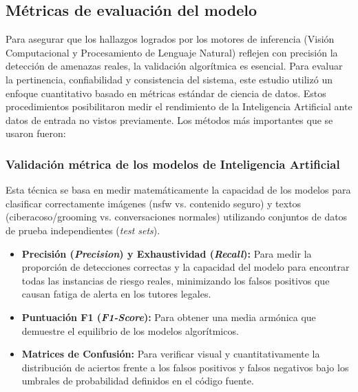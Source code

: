 \subsection{Métricas de evaluación del modelo}
Para asegurar que los hallazgos logrados por los motores de inferencia (Visión Computacional y Procesamiento de Lenguaje Natural) reflejen con precisión la detección de amenazas reales, la validación algorítmica es esencial. Para evaluar la pertinencia, confiabilidad y consistencia del sistema, este estudio utilizó un enfoque cuantitativo basado en métricas estándar de ciencia de datos. Estos procedimientos posibilitaron medir el rendimiento de la Inteligencia Artificial ante datos de entrada no vistos previamente. Los métodos más importantes que se usaron fueron:

\subsubsection{Validación métrica de los modelos de Inteligencia Artificial}
Esta técnica se basa en medir matemáticamente la capacidad de los modelos para clasificar correctamente imágenes (\gls{nsfw} vs. contenido seguro) y textos (ciberacoso/grooming vs. conversaciones normales) utilizando conjuntos de datos de prueba independientes (\textit{test sets}).

\begin{itemize}
    \item \textbf{Precisión (\textit{Precision}) y Exhaustividad (\textit{Recall}):} Para medir la proporción de detecciones correctas y la capacidad del modelo para encontrar todas las instancias de riesgo reales, minimizando los falsos positivos que causan fatiga de alerta en los tutores legales.
    \item \textbf{Puntuación F1 (\textit{F1-Score}):} Para obtener una media armónica que demuestre el equilibrio de los modelos algorítmicos.
    \item \textbf{Matrices de Confusión:} Para verificar visual y cuantitativamente la distribución de aciertos frente a los falsos positivos y falsos negativos bajo los umbrales de probabilidad definidos en el código fuente.
\end{itemize}

